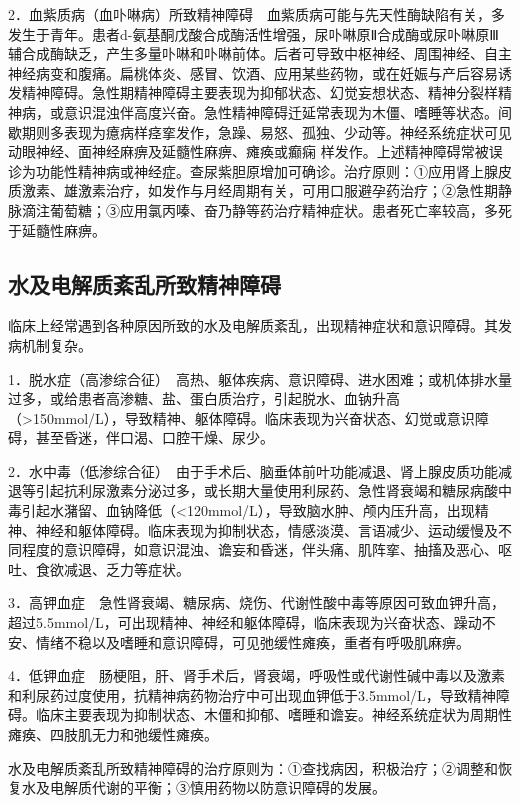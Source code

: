 2．血紫质病（血卟啉病）所致精神障碍　血紫质病可能与先天性酶缺陷有关，多发生于青年。患者d-氨基酮戊酸合成酶活性增强，尿卟啉原Ⅱ合成酶或尿卟啉原Ⅲ辅合成酶缺乏，产生多量卟啉和卟啉前体。后者可导致中枢神经、周围神经、自主神经病变和腹痛。扁桃体炎、感冒、饮酒、应用某些药物，或在妊娠与产后容易诱发精神障碍。急性期精神障碍主要表现为抑郁状态、幻觉妄想状态、精神分裂样精神病，或意识混浊伴高度兴奋。急性精神障碍迁延常表现为木僵、嗜睡等状态。间歇期则多表现为癔病样痉挛发作，急躁、易怒、孤独、少动等。神经系统症状可见动眼神经、面神经麻痹及延髓性麻痹、瘫痪或癫痫
样发作。上述精神障碍常被误诊为功能性精神病或神经症。查尿紫胆原增加可确诊。治疗原则：①应用肾上腺皮质激素、雄激素治疗，如发作与月经周期有关，可用口服避孕药治疗；②急性期静脉滴注葡萄糖；③应用氯丙嗪、奋乃静等药治疗精神症状。患者死亡率较高，多死于延髓性麻痹。

\subsection{水及电解质紊乱所致精神障碍}

临床上经常遇到各种原因所致的水及电解质紊乱，出现精神症状和意识障碍。其发病机制复杂。

1．脱水症（高渗综合征）　高热、躯体疾病、意识障碍、进水困难；或机体排水量过多，或给患者高渗糖、盐、蛋白质治疗，引起脱水、血钠升高（\textgreater{}150mmol/L），导致精神、躯体障碍。临床表现为兴奋状态、幻觉或意识障碍，甚至昏迷，伴口渴、口腔干燥、尿少。

2．水中毒（低渗综合征）　由于手术后、脑垂体前叶功能减退、肾上腺皮质功能减退等引起抗利尿激素分泌过多，或长期大量使用利尿药、急性肾衰竭和糖尿病酸中毒引起水潴留、血钠降低（\textless{}120mmol/L），导致脑水肿、颅内压升高，出现精神、神经和躯体障碍。临床表现为抑制状态，情感淡漠、言语减少、运动缓慢及不同程度的意识障碍，如意识混浊、谵妄和昏迷，伴头痛、肌阵挛、抽搐及恶心、呕吐、食欲减退、乏力等症状。

3．高钾血症　急性肾衰竭、糖尿病、烧伤、代谢性酸中毒等原因可致血钾升高，超过5.5mmol/L，可出现精神、神经和躯体障碍，临床表现为兴奋状态、躁动不安、情绪不稳以及嗜睡和意识障碍，可见弛缓性瘫痪，重者有呼吸肌麻痹。

4．低钾血症　肠梗阻，肝、肾手术后，肾衰竭，呼吸性或代谢性碱中毒以及激素和利尿药过度使用，抗精神病药物治疗中可出现血钾低于3.5mmol/L，导致精神障碍。临床主要表现为抑制状态、木僵和抑郁、嗜睡和谵妄。神经系统症状为周期性瘫痪、四肢肌无力和弛缓性瘫痪。

水及电解质紊乱所致精神障碍的治疗原则为：①查找病因，积极治疗；②调整和恢复水及电解质代谢的平衡；③慎用药物以防意识障碍的发展。

